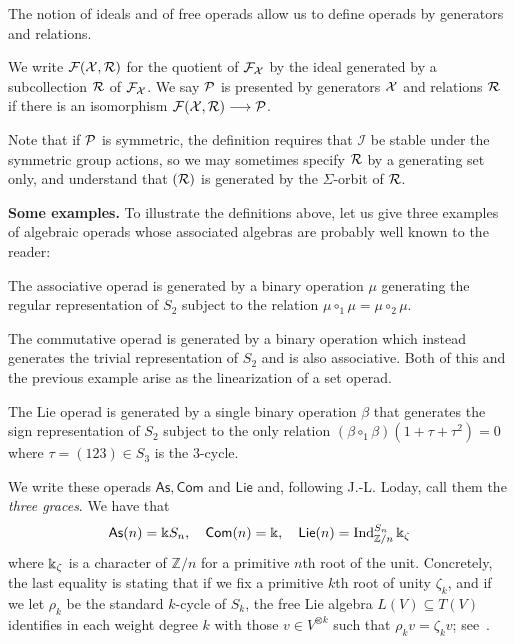 The notion of ideals and of free operads allow us
to define operads by generators and relations.

\begin{definition}
We write $\mathcal{F}(\mathcal{X},\mathcal{R})$ for the quotient of 
$\mathcal{F}_{\mathcal{X}}$
by the ideal generated by a subcollection $\mathcal{R}$
of $\mathcal{F}_{\mathcal{X}}$. 
 We say ${\mathcal{P}}$ is presented by generators
$\mathcal{X}$ and relations $\mathcal{R}$ if there is an
isomorphism $\mathcal{F}(\mathcal{X},\mathcal{R}) \longrightarrow
{\mathcal{P}}$.
\end{definition}

Note that if ${\mathcal{P}}$ is symmetric, the definition
requires that $\mathcal{I}$ be stable under
the symmetric group actions, so we may 
sometimes specify $\mathcal{R}$ by a generating set 
only, and understand
that $(\mathcal{R})$ is generated by the $\Sigma$-orbit
of $\mathcal{R}$.

\bigskip

\textbf{Some examples.}
To illustrate the definitions above, let us
give three examples of algebraic operads whose
associated algebras are probably well known
to the reader: 
\begin{tenumerate}
\item The associative operad is generated by a 
binary operation $\mu$ generating the regular
representation of $S_2$ subject to the relation
$\mu\circ_1 \mu = \mu \circ_2 \mu$. 
\item The commutative operad is generated by a 
binary operation which instead generates the
trivial representation of $S_2$ and is
also associative. Both of this 
and the previous
example arise as the linearization of a set operad.
\item 
The Lie operad is generated by a single binary 
operation $\beta$ that generates the sign 
representation of $S_2$ subject to the only
relation
$(\beta \circ_1 \beta)(1+\tau+\tau^2) = 0$
where $\tau = (123)\in S_3$ is the $3$-cycle. 
\end{tenumerate}
We write these operads $\mathsf{As},\mathsf{Com}$
and $\mathsf{Lie}$ and, following J.-L. Loday,
call them the \emph{three graces}. We have that
\[ \mathsf{As}(n) = \Bbbk S_n,\quad
 	\mathsf{Com}(n) = \Bbbk, \quad
 	 \mathsf{Lie}(n) = \operatorname{Ind}_{\mathbb Z/n}^{S_n} \Bbbk_\zeta \] 
 where $\Bbbk_\zeta$ is a character of $\mathbb Z/n$
 for a primitive $n$th root of the unit. Concretely,
 the last equality is stating that if we fix a primitive
 $k$th root of unity $\zeta_k$, and if we let $\rho_k$ be
 the standard $k$-cycle of $S_k$, the free Lie
 algebra $L(V)\subseteq T(V)$ identifies  
 in each weight degree $k$ with those $v
 \in V^{\otimes k}$ such that $\rho_k v = \zeta_k v$; see~\cite{Klyachko1975,MO187545}.
 
